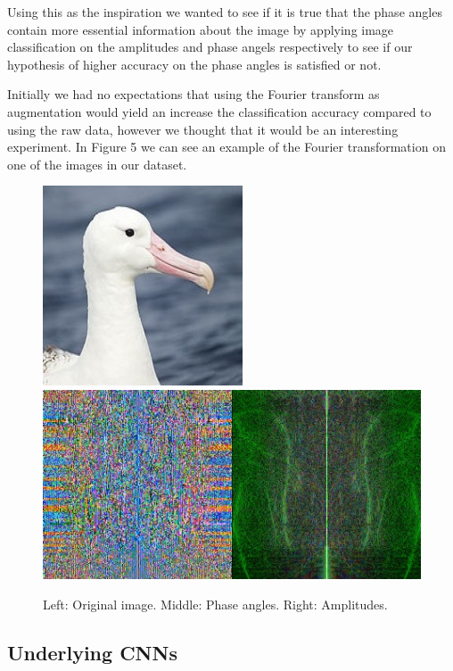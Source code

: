 \documentclass{article}
\begin{document}
Using this as the inspiration we wanted to see if it is true that the phase angles contain more essential information about the image by applying image classification on the amplitudes 
and phase angels respectively to see if our hypothesis of higher accuracy on the phase angles is satisfied or not. 

Initially we had no expectations that using the Fourier transform as augmentation would yield an increase the classification accuracy compared to using 
the raw data, however we thought that it would be an interesting experiment. 
In Figure 5 we can see an example of the Fourier transformation on one of the images in our dataset. 

\begin{figure}[!htb]
	\raggedleft
	\includegraphics[scale=0.30]{fourier1}
	\endminipage
	\raggedleft
	\includegraphics[trim=0cm 0cm 0cm 0cm, scale=0.30]{fourier2}
	\endminipage
	\caption{Left: Original image. Middle: Phase angles. Right: Amplitudes.}
\end{figure}

\medskip

\subsection{Underlying CNNs}
\end{document}
